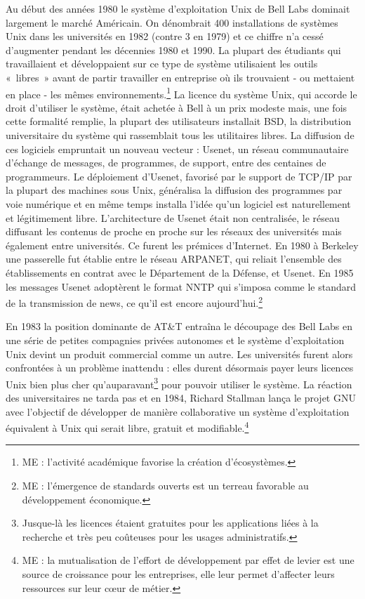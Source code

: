 \documentclass{FramateX}
\begin{document}
\begin{refsection}
Au début des années 1980 le système d'exploitation Unix
de Bell Labs dominait largement le marché Américain. On dénombrait 400
installations de systèmes Unix dans les universités en 1982 (contre 3
en 1979) et ce chiffre n'a cessé
d'augmenter pendant les décennies 1980 et 1990. La
plupart des étudiants qui travaillaient et développaient sur ce type de
système utilisaient les outils «~libres~» avant de partir travailler en
entreprise où ils trouvaient - ou mettaient en place - les mêmes
environnements.\footnote{ME : l'activité académique
favorise la création d'écosystèmes.} La licence du
système Unix, qui accorde le droit d'utiliser le système, était achetée
à Bell à un prix modeste mais, une fois cette formalité remplie, la
plupart des utilisateurs installait BSD, la distribution universitaire
du système qui rassemblait tous les utilitaires libres. La diffusion de
ces logiciels empruntait un nouveau vecteur : Usenet, un réseau
communautaire d'échange de messages, de programmes, de support, entre
des centaines de programmeurs. Le déploiement d'Usenet, favorisé par le
support de TCP/IP par la plupart des machines sous Unix, généralisa la
diffusion des programmes par voie numérique et en même temps installa
l'idée qu'un logiciel est naturellement et légitimement libre.
L'architecture de Usenet était non centralisée, le réseau diffusant les
contenus de proche en proche sur les réseaux des universités mais
également entre universités. Ce furent les prémices d'Internet. En 1980
à Berkeley une passerelle fut établie entre le réseau ARPANET, qui
reliait l'ensemble des établissements en contrat avec
le Département de la Défense, et Usenet. En 1985 les messages Usenet
adoptèrent le format NNTP qui s'imposa comme le standard de la
transmission de news, ce qu'il est encore aujourd'hui.\footnote{ME :
l'émergence de standards ouverts est un terreau
favorable au développement économique.}

En 1983 la position dominante de AT\&T entraîna le découpage des Bell
Labs en une série de petites compagnies privées autonomes et le système
d'exploitation Unix devint un produit commercial comme un autre. Les
universités furent alors confrontées à un problème inattendu : elles
durent désormais payer leurs licences Unix bien plus cher
qu'auparavant\footnote{Jusque-là les licences étaient gratuites pour
les applications liées à la recherche et très peu coûteuses pour les
usages administratifs.} pour pouvoir utiliser le système. La
réaction des universitaires ne tarda pas et en 1984, Richard Stallman
lança le projet GNU avec l'objectif de développer de manière
collaborative un système d'exploitation équivalent à Unix qui serait
libre, gratuit et modifiable.\footnote{ME : la mutualisation de
l'effort de développement par effet de levier est une
source de croissance pour les entreprises, elle leur permet
d'affecter leurs ressources sur leur cœur de métier.}


\end{refsection}
\end{document}
